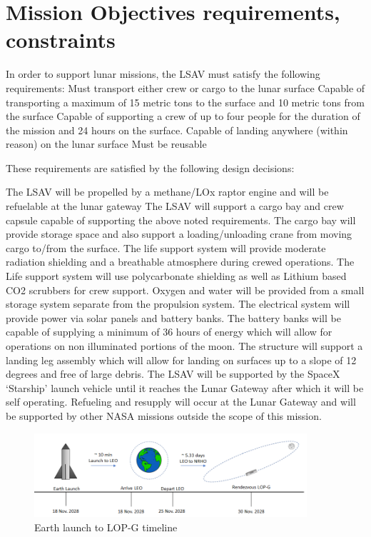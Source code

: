 \documentclass[10pt]{article}
\begin{document}
\section{Mission Objectives  requirements, constraints}

In order to support lunar missions, the LSAV must satisfy the
following requirements: Must transport either crew or cargo to the
lunar surface Capable of transporting a maximum of 15 metric tons to
the surface and 10 metric tons from the surface Capable of supporting
a crew of up to four people for the duration of the mission and 24
hours on the surface.  Capable of landing anywhere (within reason) on
the lunar surface Must be reusable

These requirements are satisfied by the following design decisions:

The LSAV will be propelled by a methane/LOx raptor engine and will be
refuelable at the lunar gateway The LSAV will support a cargo bay and
crew capsule capable of supporting the above noted requirements. The
cargo bay will provide storage space and also support a
loading/unloading crane from moving cargo to/from the surface.  The
life support system will provide moderate radiation shielding and a
breathable atmosphere during crewed operations. The Life support
system will use polycarbonate shielding as well as Lithium based CO2
scrubbers for crew support. Oxygen and water will be provided from a
small storage system separate from the propulsion system.  The
electrical system will provide power via solar panels and battery
banks. The battery banks will be capable of supplying a minimum of 36
hours of energy which will allow for operations on non illuminated
portions of the moon.  The structure will support a landing leg
assembly which will allow for landing on surfaces up to a slope of 12
degrees and free of large debris.  The LSAV will be supported by the
SpaceX ‘Starship’ launch vehicle until it reaches the Lunar Gateway
after which it will be self operating.  Refueling and resupply will
occur at the Lunar Gateway and will be supported by other NASA
missions outside the scope of this mission.

\begin{figure}[H]
  \centering
  \includegraphics[width=0.9\textwidth]{toon1}
  \caption{Earth launch to LOP-G timeline}
  \label{fig:toon1}
\end{figure}
\end{document}

